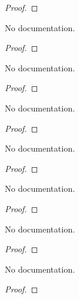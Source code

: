 \begin{proof}
    \leanok
\end{proof}

\begin{theorem}\label{gradient_const_mul}
        \leanok
                No documentation.
    \end{theorem}

\begin{proof}
    \leanok
\end{proof}

\begin{theorem}\label{HasGradientWithinAt.mul_const'}
        \leanok
                No documentation.
    \end{theorem}

\begin{proof}
    \leanok
\end{proof}

\begin{theorem}\label{HasGradientAt.mul_const'}
        \leanok
                No documentation.
    \end{theorem}

\begin{proof}
    \leanok
\end{proof}

\begin{theorem}\label{gradient_mul_const'}
        \leanok
                No documentation.
    \end{theorem}

\begin{proof}
    \leanok
\end{proof}

\begin{theorem}\label{HasGradientWithinAt.const_mul'}
        \leanok
                No documentation.
    \end{theorem}

\begin{proof}
    \leanok
\end{proof}

\begin{theorem}\label{HasGradientAt.const_mul'}
        \leanok
                No documentation.
    \end{theorem}

\begin{proof}
    \leanok
\end{proof}

\begin{theorem}\label{gradient_const_mul'}
        \leanok
                No documentation.
    \end{theorem}

\begin{proof}
    \leanok
\end{proof}

